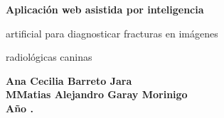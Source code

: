 \documentclass[12pt,a4paper,oneside]{book}
\begin{document}
\vspace{3 cm}
{
\noindent
\begin{center}
\huge \bf Aplicación web asistida por inteligencia 

\vspace{0.5cm}
artificial para diagnosticar fracturas en imágenes


\vspace{0.5 cm}
 radiológicas caninas
\end{center}
}


\vspace{4 cm}

\begin{center}
{\textbf{\Large Ana Cecilia Barreto Jara}\\[5mm]
\textbf{\Large MMatias Alejandro Garay Morinigo}\\[5mm]
\vspace{1 cm}
\textbf{Año \the\year.}}
\end{center}









\cleardoublepage


\cleardoublepage

\tableofcontents

\cleardoublepage

\listoffigures
{}
\cleardoublepage

\listoftables
{}




{}
\printglossary[type=\acronymtype] %

\mainmatter
{} %







\end{document}
